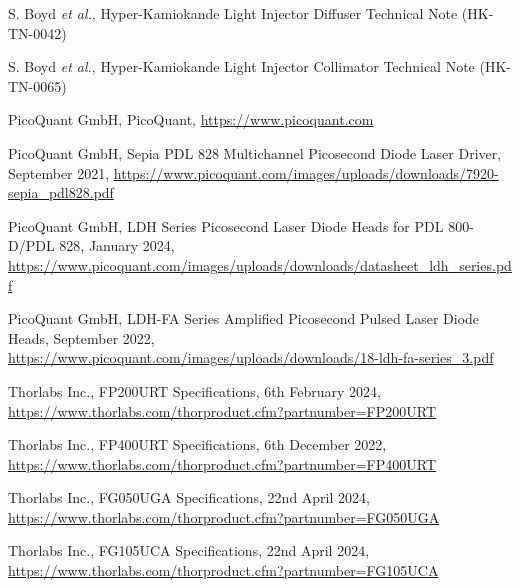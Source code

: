 \documentclass[a4paper,11pt]{article}
\providecommand{\DIFaddbegin}{} %
\providecommand{\DIFaddend}{} %
\providecommand{\DIFdelbegin}{} %
\providecommand{\DIFdelend}{} %
\newcommand{\DIFscaledelfig}{0.5}
\newlength{\DIFdelgraphicswidth} %
\newlength{\DIFdelgraphicsheight} %
\newcommand{\DIFaddincludegraphics}[2][]{{\color{blue}\fbox{\DIFOincludegraphics[#1]{#2}}}} %
\newcommand{\DIFdelincludegraphics}[2][]{%
\sbox{\DIFdelgraphicsbox}{\DIFOincludegraphics[#1]{#2}}%
\settoboxwidth{\DIFdelgraphicswidth}{\DIFdelgraphicsbox} %
\settoboxtotalheight{\DIFdelgraphicsheight}{\DIFdelgraphicsbox} %
\scalebox{\DIFscaledelfig}{%
\parbox[b]{\DIFdelgraphicswidth}{\usebox{\DIFdelgraphicsbox}\\[-\baselineskip] \rule{\DIFdelgraphicswidth}{0em}}\llap{\resizebox{\DIFdelgraphicswidth}{\DIFdelgraphicsheight}{%
\setlength{\unitlength}{\DIFdelgraphicswidth}%
\begin{picture}(1,1)%
\thicklines\linethickness{2pt} %
{\color[rgb]{1,0,0}\put(0,0){\framebox(1,1){}}}%
{\color[rgb]{1,0,0}\put(0,0){\line( 1,1){1}}}%
{\color[rgb]{1,0,0}\put(0,1){\line(1,-1){1}}}%
\end{picture}%
}\hspace*{3pt}}} %
} %
\DeclareRobustCommand{\DIFaddbegin}{\DIFOaddbegin \let\includegraphics\DIFaddincludegraphics} %
\DeclareRobustCommand{\DIFaddend}{\DIFOaddend \let\includegraphics\DIFOincludegraphics} %
\DeclareRobustCommand{\DIFdelbegin}{\DIFOdelbegin \let\includegraphics\DIFdelincludegraphics} %
\DeclareRobustCommand{\DIFdelend}{\DIFOaddend \let\includegraphics\DIFOincludegraphics} %
\begin{document}
\newpage
\begin{thebibliography}{99}

S. Boyd {\it et al.}, Hyper-Kamiokande Light Injector Diffuser Technical Note (HK-TN-0042)

S. Boyd {\it et al.}, Hyper-Kamiokande Light Injector Collimator Technical Note (HK-TN-0065)

PicoQuant GmbH, PicoQuant, \url{https://www.picoquant.com}

PicoQuant GmbH, Sepia PDL 828 Multichannel Picosecond Diode Laser Driver, September 2021, \url{https://www.picoquant.com/images/uploads/downloads/7920-sepia_pdl828.pdf}

PicoQuant GmbH, LDH Series Picosecond Laser Diode Heads for PDL 800-D/PDL 828, January 2024, \url{https://www.picoquant.com/images/uploads/downloads/datasheet_ldh_series.pdf}

PicoQuant GmbH, LDH-FA Series Amplified Picosecond Pulsed Laser Diode Heads, September 2022, \url{https://www.picoquant.com/images/uploads/downloads/18-ldh-fa-series_3.pdf}

Thorlabs Inc., FP200URT Specifications, 6th February 2024, \DIFdelbegin %
\DIFdelend \DIFaddbegin \url{https://www.thorlabs.com/thorproduct.cfm?partnumber=FP200URT}
\DIFaddend 

Thorlabs Inc., FP400URT Specifications, 6th December 2022, \DIFdelbegin %
\DIFdelend \DIFaddbegin \url{https://www.thorlabs.com/thorproduct.cfm?partnumber=FP400URT}
\DIFaddend 

Thorlabs Inc., FG050UGA Specifications, 22nd April 2024, \DIFdelbegin %
\DIFdelend \DIFaddbegin \url{https://www.thorlabs.com/thorproduct.cfm?partnumber=FG050UGA}
\DIFaddend 

Thorlabs Inc., FG105UCA Specifications, 22nd April 2024, \DIFdelbegin %
\DIFdelend \DIFaddbegin \url{https://www.thorlabs.com/thorproduct.cfm?partnumber=FG105UCA}
\DIFaddend 


\end{thebibliography}
\end{document}
